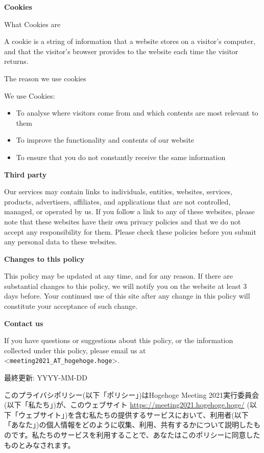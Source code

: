 \documentclass[titlepage,10pt,a4paper,uplatex]{jsbook}
\newenvironment{content}{\begin{shaded}\vspace{-1em}\raggedright\ttfamily\footnotesize\setlength{\baselineskip}{1.4em}}{\end{shaded}\vspace{-1em}}
\renewcommand{\textbf}[1]{{\bfseries\sffamily#1}}
\begin{document}
\begin{content}
\textbf{\Large Cookies}

{\Large What Cookies are}

A cookie is a string of information that a website stores on a visitor's computer, and that the visitor's browser provides to the website each time the visitor returns.

{\Large The reason we use cookies}

We use Cookies:

\begin{itemize}
\item To analyse where visitors come from and which contents are most relevant to them
\item To improve the functionality and contents of our website
\item To ensure that you do not constantly receive the same information
\end{itemize}

\textbf{\Large Third party}

Our services may contain links to individuals, entities, websites, services, products, advertisers, affiliates, and applications that are not controlled, managed, or operated by us. If you follow a link to any of these websites, please note that these websites have their own privacy policies and that we do not accept any responsibility for them. Please check these policies before you submit any personal data to these websites.

\textbf{\Large Changes to this policy}

This policy may be updated at any time, and for any reason. If there are substantial changes to this policy, we will notify you on the website at least 3 days before. Your continued use of this site after any change in this policy will constitute your acceptance of such change.

\textbf{\Large Contact us}

If you have questions or suggestions about this policy, or the information collected under this policy, please email us at {\textless}\texttt{meeting2021\_AT\_hogehoge.hoge}{\textgreater}.

最終更新: YYYY-MM-DD

このプライバシポリシー(以下「ポリシー」)はHogehoge Meeting 2021実行委員会(以下「私たち」)が、このウェブサイト \url{https://meeting2021.hogehoge.hoge/} (以下「ウェブサイト」)を含む私たちの提供するサービスにおいて、利用者(以下「あなた」)の個人情報をどのように収集、利用、共有するかについて説明したものです。私たちのサービスを利用することで、あなたはこのポリシーに同意したものとみなされます。


\end{content}
\end{document}
